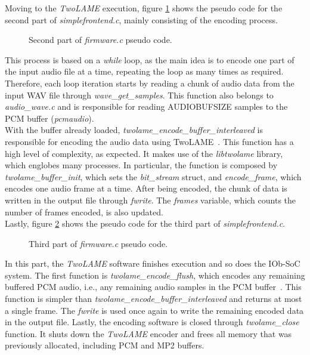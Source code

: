 Moving to the \textit{TwoLAME} execution, figure \ref{pseudo2} shows the pseudo code for the second part of \textit{simplefrontend.c}, mainly consisting of the encoding process.

\begin{figure}[H]
\centerline{}
\caption{Second part of \textit{firmware.c} pseudo code.}
\label{pseudo2}
\end{figure}


This process is based on a \textit{while} loop, as the main idea is to encode one part of the input audio file at a time, repeating the loop as many times as required. Therefore, each loop iteration starts by reading a chunk of audio data from the input WAV file through \textit{wave\_get\_samples}. This function also belongs to \textit{audio\_wave.c} and is responsible for reading AUDIOBUFSIZE samples to the PCM buffer (\textit{pcmaudio}).\\
With the buffer already loaded, \textit{twolame\_encode\_buffer\_interleaved} is responsible for encoding the audio data using TwoLAME~\cite{twolameapi}. This function has a high level of complexity, as expected. It makes use of the \textit{libtwolame} library, which englobes many processes. In particular, the function is composed by \textit{twolame\_buffer\_init}, which sets the \textit{bit\_stream} struct, and \textit{encode\_frame}, which encodes one audio frame at a time.
After being encoded, the chunk of data is written in the output file through \textit{fwrite}. The \textit{frames} variable, which counts the number of frames encoded, is also updated. \\

Lastly, figure \ref{pseudo3} shows the pseudo code for the third part of \textit{simplefrontend.c}. 

\begin{figure}[H]
\centerline{}
\caption{Third part of \textit{firmware.c} pseudo code.}
\label{pseudo3}
\end{figure}


In this part, the \textit{TwoLAME} software finishes execution and so does the IOb-SoC system.
The first function is \textit{twolame\_encode\_flush}, which encodes any remaining buffered PCM audio, i.e., any remaining audio samples in the PCM buffer~\cite{twolameapi}. This function is simpler than \textit{twolame\_encode\_buffer\_interleaved} and returns at most a single frame.
The \textit{fwrite} is used once again to write the remaining encoded data in the output file. Lastly, the encoding software is closed through \textit{twolame\_close} function. It shuts down the \textit{TwoLAME} encoder and frees all memory that was previously allocated, including PCM and MP2 buffers.

